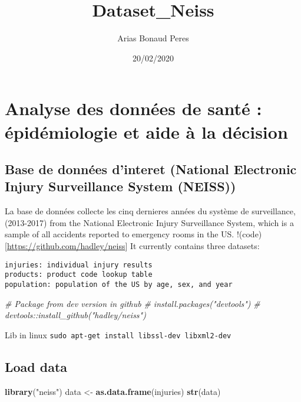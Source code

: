 \documentclass[]{article}
\title{Dataset\_Neiss}
\author{Arias Bonaud Peres}
\date{20/02/2020}
\newenvironment{Shaded}{\begin{snugshade}}{\end{snugshade}}
\newcommand{\CommentTok}[1]{\textcolor[rgb]{0.56,0.35,0.01}{\textit{#1}}}
\newcommand{\KeywordTok}[1]{\textcolor[rgb]{0.13,0.29,0.53}{\textbf{#1}}}
\newcommand{\NormalTok}[1]{#1}
\newcommand{\StringTok}[1]{\textcolor[rgb]{0.31,0.60,0.02}{#1}}
\begin{document}
\maketitle

\hypertarget{analyse-des-donnees-de-sante-epidemiologie-et-aide-a-la-decision}{%
\section{Analyse des données de santé : épidémiologie et aide à la
décision}\label{analyse-des-donnees-de-sante-epidemiologie-et-aide-a-la-decision}}

\hypertarget{base-de-donnees-dinteret-national-electronic-injury-surveillance-system-neiss}{%
\subsection{Base de données d'interet (National Electronic Injury
Surveillance System
(NEISS))}\label{base-de-donnees-dinteret-national-electronic-injury-surveillance-system-neiss}}

La base de données collecte les cinq dernieres années du système de
surveillance, (2013-2017) from the National Electronic Injury
Surveillance System, which is a sample of all accidents reported to
emergency rooms in the US.
!(code){[}\url{https://github.com/hadley/neiss}{]} It currently contains
three datasets:

\begin{verbatim}
injuries: individual injury results
products: product code lookup table
population: population of the US by age, sex, and year
\end{verbatim}

\begin{Shaded}
\begin{Highlighting}[]
\CommentTok{# Package from dev version in github}
\CommentTok{# install.packages("devtools")}
\CommentTok{# devtools::install_github("hadley/neiss")}
\end{Highlighting}
\end{Shaded}

Lib in linux \texttt{sudo\ apt-get\ install\ libssl-dev\ libxml2-dev}

\hypertarget{load-data}{%
\subsection{Load data}\label{load-data}}

\begin{Shaded}
\begin{Highlighting}[]
\KeywordTok{library}\NormalTok{(}\StringTok{"neiss"}\NormalTok{)}
\NormalTok{data <-}\StringTok{ }\KeywordTok{as.data.frame}\NormalTok{(injuries)}
\KeywordTok{str}\NormalTok{(data)}
\end{Highlighting}
\end{Shaded}
\end{document}
